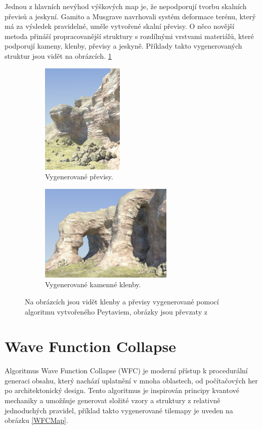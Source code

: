Jednou z hlavních nevýhod výškových map je, že nepodporují tvorbu skalních převisů a jeskyní. Gamito a Musgrave \cite{Gamito2001ProceduralLW} navrhovali systém deformace terénu, který má za výsledek pravidelné, uměle vytvořené skalní převisy. O něco novější metoda \cite{Peytavie09} přináší propracovanější struktury s rozdílnými vrstvami materiálů, které podporují kameny, klenby, převisy a jeskyně. Příklady takto vygenerovaných struktur jsou vidět na obrázcích. \ref{PeytavieGen}

\begin{figure}[H]
	\centering
	\begin{subfigure}{0.475\textwidth}
		\centering
		\includegraphics[scale=1]{obrazky-figures/Overhang.png}
		\caption{Vygenerované převisy.}
	\end{subfigure}
	\begin{subfigure}{0.475\textwidth}
		\centering
		\includegraphics[scale=1]{obrazky-figures/Arches.png}
		\caption{Vygenerované kamenné klenby.}
	\end{subfigure}
	\caption{Na obrázcích jsou vidět klenby a převisy vygenerované pomocí algoritmu vytvořeného Peytaviem, obrázky jsou převzaty z \cite{Peytavie09}}
	\label{PeytavieGen}
\end{figure}

\section{Wave Function Collapse}
Algoritmus Wave Function Collapse (WFC) je moderní přístup k procedurální generaci obsahu, který nachází uplatnění v mnoha oblastech, od počítačových her po architektonický design. Tento algoritmus je inspirován principy kvantové mechaniky a umožňuje generovat složité vzory a struktury z relativně jednoduchých pravidel, příklad takto vygenerované tilemapy je uveden na obrázku \ref{WFCMap}.


